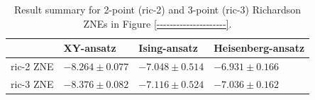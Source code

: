 \begin{table}[h]
\caption{Result summary for 2-point (ric-2) and 3-point (ric-3) Richardson ZNEs in Figure \ref{---------------------}.}
\begin{tabular}{@{}llll@{}}
\toprule
  & XY-ansatz  & Ising-ansatz  & Heisenberg-ansatz\\
\midrule
ric-2 ZNE & $-8.264 \pm 0.077$ & $-7.048 \pm 0.514$ & $-6.931 \pm 0.166$ \\
ric-3 ZNE & $-8.376 \pm 0.082$ & $-7.116 \pm 0.524$ & $-7.036 \pm 0.162$ \\
\bottomrule
\end{tabular}
\label{table-dephasing-noise-free-time-evo}
\end{table}
